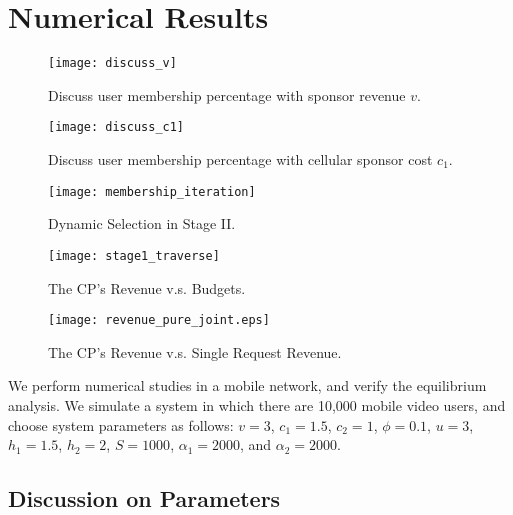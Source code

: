 \section{Numerical Results}



 \begin{figure*}[t]
  \centering

    \begin{minipage}[h]{.18\linewidth}
\texttt{[image: discuss\_v]}
\caption{Discuss user membership percentage with sponsor revenue $v$.}\label{fig:v_mu}	
  \end{minipage}
  \begin{minipage}[h]{.18\linewidth}
\texttt{[image: discuss\_c1]}
\caption{Discuss user membership percentage with cellular sponsor cost $c_1$.}\label{fig:c2_mu}	
  \end{minipage}
  \begin{minipage}[h]{.18\linewidth}
	\texttt{[image: membership\_iteration]}
	 \caption{Dynamic Selection in Stage II.}\label{fig:dynamic2}	
  \end{minipage}
  \begin{minipage}[h]{.18\linewidth}
     \texttt{[image: stage1\_traverse]}
	 \caption{The CP's Revenue v.s. Budgets.}\label{fig:optimal1}
  \end{minipage}
    \begin{minipage}[h]{.18\linewidth}	
     	 \texttt{[image: revenue\_pure\_joint.eps]}
	 \caption{The CP's Revenue v.s. Single Request Revenue.}\label{fig:revenue_pure_joint}	
  \end{minipage}
  \vspace{-5mm}
  \end{figure*}
We perform numerical studies in a mobile network, and verify the equilibrium analysis. We simulate a system in which there are 10,000 mobile video users, and choose system parameters as follows: $v=3$, $c_1=1.5$, $c_2=1$, $\phi=0.1$, $u = 3$, $h_1=1.5$, $h_2=2$, $S=1000$, $\alpha_1=2000$, and $\alpha_2=2000$.



\subsection{Discussion on Parameters}


